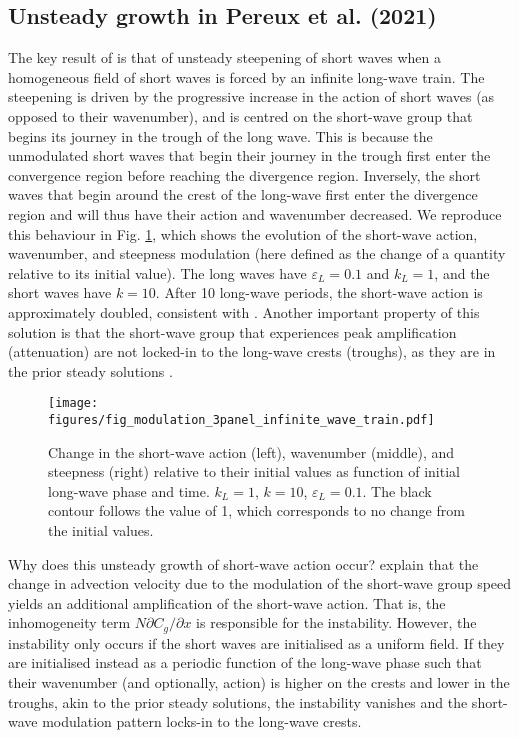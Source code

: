 \documentclass[lineno]{jfm}
\begin{document}
\subsection{Unsteady growth in Pereux et al. (2021)}
\label{subsection:unsteady_growth}

The key result of \citet{peureux2021unsteady} is that of unsteady steepening of
short waves when a homogeneous field of short waves is forced by an infinite
long-wave train.
The steepening is driven by the progressive increase in the action of short
waves (as opposed to their wavenumber), and is centred on the short-wave group
that begins its journey in the trough of the long wave.
This is because the unmodulated short waves that begin their journey in the
trough first enter the convergence region before reaching the divergence region.
Inversely, the short waves that begin around the crest of the long-wave first
enter the divergence region and will thus have their action and wavenumber
decreased.
We reproduce this behaviour in Fig. \ref{fig:modulation_3panel_infinite}, which
shows the evolution of the short-wave action, wavenumber, and steepness
modulation (here defined as the change of a quantity relative to its initial value).
The long waves have $\varepsilon_L = 0.1$ and $k_L = 1$, and the short waves
have $k = 10$.
After 10 long-wave periods, the short-wave action is approximately doubled,
consistent with \citet{peureux2021unsteady}.
Another important property of this solution is that the short-wave group that
experiences peak amplification (attenuation) are not locked-in to the long-wave
crests (troughs), as they are in the prior steady solutions
\citep{longuet1960changes,longuet1987propagation,zhang1990evolution}.

\begin{figure}
\centering
\texttt{[image: figures/fig\_modulation\_3panel\_infinite\_wave\_train.pdf]}
\caption{
  Change in the short-wave action (left), wavenumber (middle), and steepness (right)
  relative to their initial values as function of initial long-wave phase and time.
  $k_L = 1$, $k = 10$, $\varepsilon_L = 0.1$.
  The black contour follows the value of 1, which corresponds to no change
  from the initial values.
}
\label{fig:modulation_3panel_infinite}
\end{figure}

Why does this unsteady growth of short-wave action occur?
\citet{peureux2021unsteady} explain that the change in advection velocity due to
the modulation of the short-wave group speed yields an additional amplification
of the short-wave action.
That is, the inhomogeneity term $N \partial C_g / \partial x$ is
responsible for the instability.
However, the instability only occurs if the short waves are initialised as a
uniform field.
If they are initialised instead as a periodic function of the long-wave phase
such that their wavenumber (and optionally, action) is higher on the crests
and lower in the troughs, akin to the prior steady solutions, the instability
vanishes and the short-wave modulation pattern locks-in to the long-wave
crests.
\end{document}
